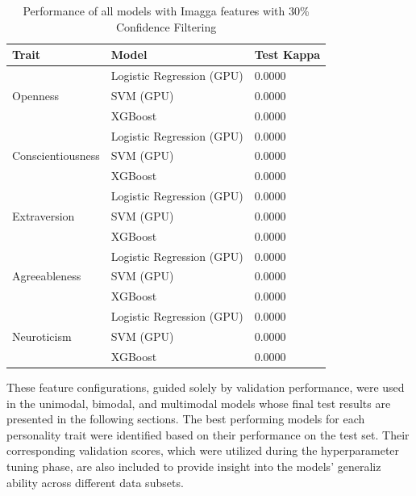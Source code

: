 \begin{table}[H]
    \centering
    \caption{Performance of all models with Imagga features with 30\% Confidence Filtering}
    \label{tab:imagga_30}
    \begin{tabular}{lll}
        \hline
        \textbf{Trait} & \textbf{Model} & \textbf{Test Kappa} \\ \hline
        \multirow{3}{*}{Openness} & Logistic Regression (GPU) & 0.0000 \\ \cline{2-3} 
                                  & SVM (GPU)                 & 0.0000 \\ \cline{2-3} 
                                  & XGBoost                   & 0.0000 \\ \hline
        \multirow{3}{*}{Conscientiousness} & Logistic Regression (GPU) & 0.0000 \\ \cline{2-3} 
                                           & SVM (GPU)                 & 0.0000 \\ \cline{2-3} 
                                           & XGBoost                   & 0.0000 \\ \hline
        \multirow{3}{*}{Extraversion} & Logistic Regression (GPU) & 0.0000 \\ \cline{2-3} 
                                      & SVM (GPU)                 & 0.0000 \\ \cline{2-3} 
                                      & XGBoost                   & 0.0000 \\ \hline
        \multirow{3}{*}{Agreeableness} & Logistic Regression (GPU) & 0.0000 \\ \cline{2-3} 
                                       & SVM (GPU)                 & 0.0000 \\ \cline{2-3} 
                                       & XGBoost                   & 0.0000 \\ \hline
        \multirow{3}{*}{Neuroticism} & Logistic Regression (GPU) & 0.0000 \\ \cline{2-3} 
                                     & SVM (GPU)                 & 0.0000 \\ \cline{2-3} 
                                     & XGBoost                   & 0.0000 \\ \hline
    \end{tabular}
\end{table}

These feature configurations, guided solely by validation performance, were used in the unimodal, bimodal, and multimodal models whose final test results are presented in the following sections. The best performing models for each personality trait were identified based on their performance on the test set. Their corresponding validation scores, which were utilized during the hyperparameter tuning phase, are also included to provide insight into the models' generaliz ability across different data subsets.

